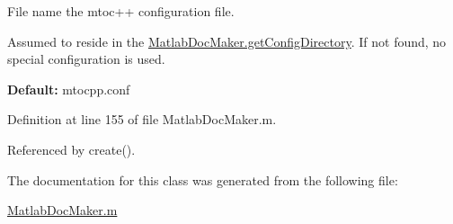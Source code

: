 File name the mtoc++ configuration file. 

Assumed to reside in the \hyperlink{class_matlab_doc_maker_a11a2a8ec616df969a911b325e39b0b4f}{Matlab\+Doc\+Maker.\+get\+Config\+Directory}. If not found, no special configuration is used.

{\bfseries Default\+:} {\ttfamily mtocpp.\+conf} 

Definition at line 155 of file Matlab\+Doc\+Maker.\+m.



Referenced by create().



The documentation for this class was generated from the following file\+:\begin{DoxyCompactItemize}
\item 
\hyperlink{_matlab_doc_maker_8m}{Matlab\+Doc\+Maker.\+m}\end{DoxyCompactItemize}

